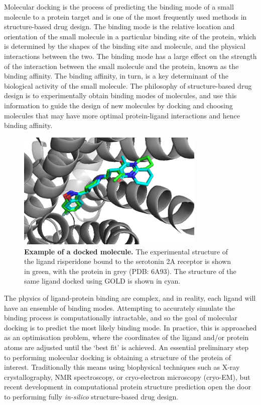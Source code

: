 Molecular docking is the process of predicting the binding mode of a small molecule to a protein target and is one of the most frequently used methods in structure-based drug design. \cite{meng2011molecular, Kitchen2004Docking} The binding mode is the relative location and orientation of the small molecule in a particular binding site of the protein, which is determined by the shapes of the binding site and molecule, and the physical interactions between the two. The binding mode has a large effect on the strength of the interaction between the small molecule and the protein, known as the binding affinity. The binding affinity, in turn, is a key determinant of the biological activity of the small molecule. The philosophy of structure-based drug design is to experimentally obtain binding modes of molecules, and use this information to guide the design of new molecules by docking and choosing molecules that may have more optimal protein-ligand interactions and hence binding affinity.

\begin{figure}[!h]
 \centering
 \includegraphics[width=0.8\textwidth]{Chapters/Background/Figs/docked_6a93.png}
 \caption{\label{fig:docked} \textbf{Example of a docked molecule.} The experimental structure of the ligand risperidone bound to the serotonin 2A receptor is shown in green, with the protein in grey (PDB: 6A93). The structure of the same ligand docked using GOLD is shown in cyan.}
\end{figure}

The physics of ligand-protein binding are complex, and in reality, each ligand will have an ensemble of binding modes. Attempting to accurately simulate the binding process is computationally intractable, and so the goal of molecular docking is to predict the most likely binding mode. In practice, this is approached as an optimisation problem, where the coordinates of the ligand and/or protein atoms are adjusted until the `best fit' is achieved. An essential preliminary step to performing molecular docking is obtaining a structure of the protein of interest. Traditionally this means using biophysical techniques such as X-ray crystallography, NMR spectroscopy, or cryo-electron microscopy (cryo-EM), but recent development in computational protein structure prediction \cite{Jumper2021AlphaFold, Wong2022AF2Docking} open the door to performing fully \textit{in-silico} structure-based drug design.

